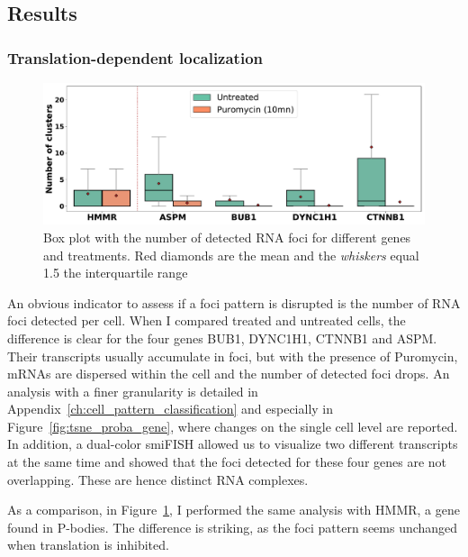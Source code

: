 \subsection{Results}
\label{subsec:results_translation_factories}

\subsubsection{Translation-dependent localization}

\begin{figure}[]
    \centering
    \includegraphics[width=\textwidth]{figures/chapter5/plot_puromycin}
    \caption[Box plot with the number of detected RNA foci]{Box plot with the number of detected RNA foci for different genes and treatments.
	Red diamonds are the mean and the \textit{whiskers} equal 1.5 the interquartile range}
    \label{fig:plot_puromycin}
\end{figure}

An obvious indicator to assess if a foci pattern is disrupted is the number of \ac{RNA} foci detected per cell.
When I compared treated and untreated cells, the difference is clear for the four genes BUB1, DYNC1H1, CTNNB1 and ASPM.
Their transcripts usually accumulate in foci, but with the presence of Puromycin, \ac{mRNA}s are dispersed within the cell and the number of detected foci drops.
An analysis with a finer granularity is detailed in Appendix~\ref{ch:cell_pattern_classification} and especially in Figure~\ref{fig:tsne_proba_gene}, where changes on the single cell level are reported.
In addition, a dual-color \ac{smiFISH} allowed us to visualize two different transcripts at the same time and showed that the foci detected for these four genes are not overlapping.
These are hence distinct \ac{RNA} complexes.

As a comparison, in Figure~\ref{fig:plot_puromycin}, I performed the same analysis with HMMR, a gene found in \ac{P-bodies}.
The difference is striking, as the foci pattern seems unchanged when translation is inhibited.

